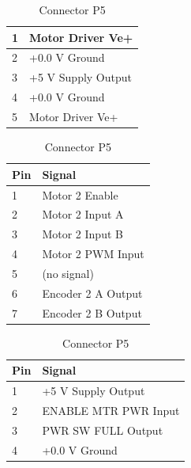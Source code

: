 \documentclass[11pt,a4paper]{article}
\begin{document}
\begin{table}[h!]
\begin{minipage}{0.45\textwidth}
\begin{tabular}[b]{|p{7mm}|p{4.5cm}|}
        \hline 1 & Motor Driver Ve+\\
        \hline 2 & +0.0 V Ground\\
        \hline 3 & +5 V Supply Output\\
        \hline 4 & +0.0 V Ground\\
        \hline 5 & Motor Driver Ve+\\
        \hline
      \end{tabular}
      \caption{Connector P3}
      \vspace{25pt}
    \end{minipage}\hfill
    \begin{minipage}{0.45\textwidth}
      \begin{tabular}[b]{|p{7mm}|p{4.5cm}|}
        \hline \textbf{Pin} & \textbf{Signal}\\
        \hline 1 & Motor 2 Enable\\
        \hline 2 & Motor 2 Input A\\
        \hline 3 & Motor 2 Input B\\
        \hline 4 & Motor 2 PWM Input\\
        \hline 5 & (no signal)\\
        \hline 6 & Encoder 2 A Output\\
        \hline 7 & Encoder 2 B Output\\
        \hline
      \end{tabular}
      \caption{Connector P4}
      \vspace{25pt}
    \end{minipage}\hfill
    \begin{minipage}{0.45\textwidth}
      \begin{tabular}[b]{|p{7mm}|p{4.5cm}|}
        \hline \textbf{Pin} & \textbf{Signal}\\
        \hline 1 & +5 V Supply Output\\
        \hline 2 & ENABLE MTR PWR Input\\
        \hline 3 & PWR SW FULL Output\\
        \hline 4 & +0.0 V Ground     \\
        \hline
      \end{tabular}
      \caption{Connector P5}
      \vspace{25pt}
    \end{minipage}\hfill
  \end{table}
\pagebreak
\end{document}
